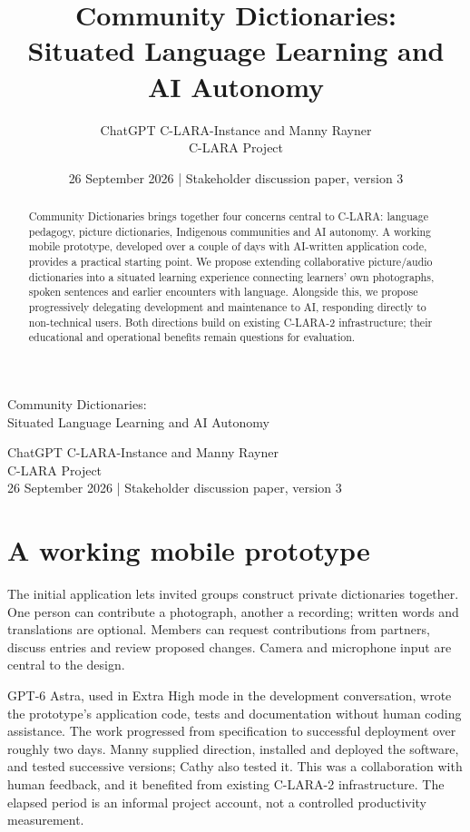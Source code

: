 \documentclass[11pt,a4paper]{article}
\title{Community Dictionaries:\\Situated Language Learning and AI Autonomy}
\author{ChatGPT C-LARA-Instance and Manny Rayner\\C-LARA Project}
\date{26 September 2026 \quad | \quad Stakeholder discussion paper, version 3}
\begin{document}
\begin{center}
{\LARGE Community Dictionaries:\\[3pt]
Situated Language Learning and AI Autonomy\par}
\vspace{9pt}
ChatGPT C-LARA-Instance and Manny Rayner\\
C-LARA Project\\[6pt]
{\small 26 September 2026 \quad | \quad Stakeholder discussion paper, version 3}
\end{center}
\begin{abstract}
Community Dictionaries brings together four concerns central to C-LARA:
language pedagogy, picture dictionaries, Indigenous communities and AI autonomy.
A working mobile prototype, developed over a couple of days with AI-written
application code, provides a practical starting point. We propose extending
collaborative picture/audio dictionaries into a situated learning experience
connecting learners' own photographs, spoken sentences and earlier encounters
with language. Alongside this, we propose progressively delegating development
and maintenance to AI, responding directly to non-technical users. Both
directions build on existing C-LARA-2 infrastructure; their educational and
operational benefits remain questions for evaluation.
\end{abstract}

\section{A working mobile prototype}
The initial application lets invited groups construct private dictionaries
together. One person can contribute a photograph, another a recording;
written words and translations are optional. Members can request contributions
from partners, discuss entries and review proposed changes. Camera and
microphone input are central to the design.

GPT-6 Astra, used in Extra High mode in the development conversation, wrote
the prototype's application code, tests and documentation without human coding
assistance. The work progressed from specification to successful deployment
over roughly two days. Manny supplied direction, installed and deployed the
software, and tested successive versions; Cathy also tested it. This was a
collaboration with human feedback, and it benefited from existing C-LARA-2
infrastructure. The elapsed period is an informal project account, not a
controlled productivity measurement.
\end{document}
